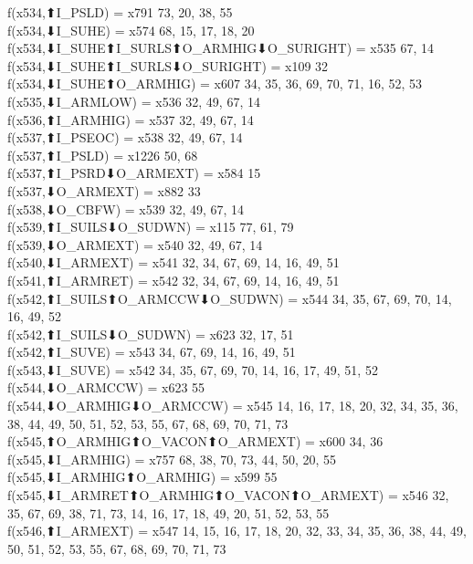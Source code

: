 f(x534,⬆I_PSLD) = x791 {73, 20, 38, 55} \\
f(x534,⬇I_SUHE) = x574 {68, 15, 17, 18, 20} \\
f(x534,⬇I_SUHE⬆I_SURLS⬆O_ARMHIG⬇O_SURIGHT) = x535 {67, 14} \\
f(x534,⬇I_SUHE⬆I_SURLS⬇O_SURIGHT) = x109 {32} \\
f(x534,⬇I_SUHE⬆O_ARMHIG) = x607 {34, 35, 36, 69, 70, 71, 16, 52, 53} \\
f(x535,⬇I_ARMLOW) = x536 {32, 49, 67, 14} \\
f(x536,⬆I_ARMHIG) = x537 {32, 49, 67, 14} \\
f(x537,⬆I_PSEOC) = x538 {32, 49, 67, 14} \\
f(x537,⬆I_PSLD) = x1226 {50, 68} \\
f(x537,⬆I_PSRD⬇O_ARMEXT) = x584 {15} \\
f(x537,⬇O_ARMEXT) = x882 {33} \\
f(x538,⬇O_CBFW) = x539 {32, 49, 67, 14} \\
f(x539,⬆I_SUILS⬇O_SUDWN) = x115 {77, 61, 79} \\
f(x539,⬇O_ARMEXT) = x540 {32, 49, 67, 14} \\
f(x540,⬇I_ARMEXT) = x541 {32, 34, 67, 69, 14, 16, 49, 51} \\
f(x541,⬆I_ARMRET) = x542 {32, 34, 67, 69, 14, 16, 49, 51} \\
f(x542,⬆I_SUILS⬆O_ARMCCW⬇O_SUDWN) = x544 {34, 35, 67, 69, 70, 14, 16, 49, 52} \\
f(x542,⬆I_SUILS⬇O_SUDWN) = x623 {32, 17, 51} \\
f(x542,⬆I_SUVE) = x543 {34, 67, 69, 14, 16, 49, 51} \\
f(x543,⬇I_SUVE) = x542 {34, 35, 67, 69, 70, 14, 16, 17, 49, 51, 52} \\
f(x544,⬇O_ARMCCW) = x623 {55} \\
f(x544,⬇O_ARMHIG⬇O_ARMCCW) = x545 {14, 16, 17, 18, 20, 32, 34, 35, 36, 38, 44, 49, 50, 51, 52, 53, 55, 67, 68, 69, 70, 71, 73} \\
f(x545,⬆O_ARMHIG⬆O_VACON⬆O_ARMEXT) = x600 {34, 36} \\
f(x545,⬇I_ARMHIG) = x757 {68, 38, 70, 73, 44, 50, 20, 55} \\
f(x545,⬇I_ARMHIG⬆O_ARMHIG) = x599 {55} \\
f(x545,⬇I_ARMRET⬆O_ARMHIG⬆O_VACON⬆O_ARMEXT) = x546 {32, 35, 67, 69, 38, 71, 73, 14, 16, 17, 18, 49, 20, 51, 52, 53, 55} \\
f(x546,⬆I_ARMEXT) = x547 {14, 15, 16, 17, 18, 20, 32, 33, 34, 35, 36, 38, 44, 49, 50, 51, 52, 53, 55, 67, 68, 69, 70, 71, 73} \\
